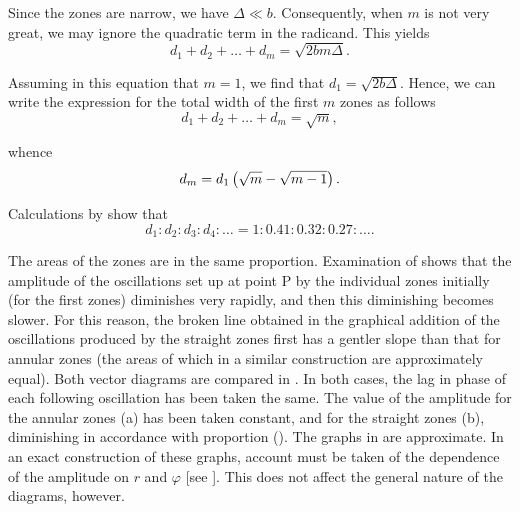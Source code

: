 \noindent
Since the zones are narrow, we have $\Delta\ll b$.
Consequently, when $m$  is not very great, we may ignore the quadratic term in the radicand.
This yields
\begin{equation*}
	d_1 + d_2 + \ldots + d_m = \sqrt{2bm\Delta}.
\end{equation*}

\noindent
Assuming in this equation that $m=1$, we find that $d_1=\sqrt{2b\Delta}$.
Hence, we can write the expression for the total width of the first $m$ zones as follows
\begin{equation*}
	d_1 + d_2 + \ldots + d_m = \sqrt{m},
\end{equation*}

\noindent
whence
\begin{equation}\label{eq:18_17}
	d_m = d_1 \left( \sqrt{m} - \sqrt{m-1} \right).
\end{equation}

Calculations by  show that
\begin{equation}\label{eq:18_18}
	d_1 : d_2 : d_3 : d_4 : \ldots = 1 : 0.41 : 0.32 : 0.27 : \ldots .
\end{equation}

\noindent
The areas of the zones are in the same proportion.
Examination of  shows that the amplitude of the oscillations set up at point P by the individual zones initially (for the first zones) diminishes very rapidly, and then this diminishing becomes slower.
For this reason, the broken line obtained in the graphical addition of the oscillations produced by the straight zones first has a gentler slope than that for annular zones (the areas of which in a similar construction are approximately equal).
Both vector diagrams are compared in .
In both cases, the lag in phase of each following oscillation has been taken the same.
The value of the amplitude for the annular zones (a) has been taken constant, and for the straight zones (b), diminishing
in accordance with proportion ().
The graphs in  are approximate.
In an exact construction of these graphs, account must be taken of the dependence of the amplitude on $r$ and $\varphi$ [see ].
This does not affect the general nature of the diagrams, however.

